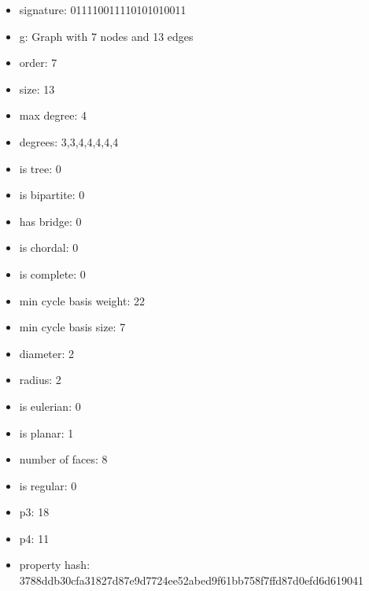 \begin{itemize}
\item signature: 011110011110101010011
\item g: Graph with 7 nodes and 13 edges
\item order: 7
\item size: 13
\item max degree: 4
\item degrees: 3,3,4,4,4,4,4
\item is tree: 0
\item is bipartite: 0
\item has bridge: 0
\item is chordal: 0
\item is complete: 0
\item min cycle basis weight: 22
\item min cycle basis size: 7
\item diameter: 2
\item radius: 2
\item is eulerian: 0
\item is planar: 1
\item number of faces: 8
\item is regular: 0
\item p3: 18
\item p4: 11
\item property hash: 3788ddb30cfa31827d87e9d7724ee52abed9f61bb758f7ffd87d0efd6d619041
\end{itemize}
\newpage
